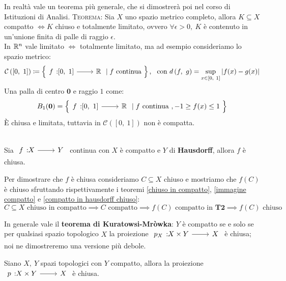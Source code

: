 \begin{digression}
In realtà vale un teorema più generale, che si dimostrerà poi nel corso di Istituzioni di Analisi.
\textsc{Teorema:} Sia $X$ uno spazio metrico completo, allora $K\subseteq X$ compatto $\iff K$ chiuso e totalmente limitato, ovvero $\forall\epsilon >0, \ K$ è contenuto in un'unione finita di palle di raggio $\epsilon$.\\
In $\mathbb{R}^n$ vale limitato $\iff$ totalmente limitato, ma ad esempio consideriamo lo spazio metrico:
	\begin{gather*}
		\mathcal{C}\left( [0, \ 1] \right) \coloneqq \left\{ \funz f {[0,\ 1]} \realset \mid f \text{ continua } \right\},  \ \ \text{con } \mvf{d}{f}{g} =\sup_{x\in [0, \ 1]} |f(x)-g(x)|
	\end{gather*}
Una palla di centro $\mathbf{0}$ e raggio $1$ come:
\begin{equation*}
	B_1(\mathbf{0})=\left\{ \funz f {[0,\ 1]} \realset \mid f \text{ continua }, -1\geq f(x) \leq 1 \ \right\}
\end{equation*}
È chiusa e limitata, tuttavia in $	\mathcal{C}\left( [0, \ 1] \right)$ non è compatta.
\end{digression}
\begin{theorema}~{}\\ \label{da compatto in T_2 è chiuso}
	Sia $\funz f X Y$ continua con $X$ è compatto e $Y$ di \textbf{Hausdorff}, allora $f$ è chiusa.
\end{theorema}
\begin{demonstration}
	Per dimostrare che $f$ è chiusa consideriamo $C\subseteq X$ chiuso e mostriamo che $f(C)$ è chiuso sfruttando rispettivamente i teoremi \ref{chiuso in compatto}, \ref{immagine compatto} e \ref{compatto in hausdorff chiuso}:
		\begin{equation*}
			C\subseteq X \text{ chiuso in compatto} \implies C \text{ compatto} \implies f(C) \text{ compatto in } \textbf{T2} \implies f(C) \text{ chiuso}
		\end{equation*}
\end{demonstration}
In generale vale il \textbf{teorema di Kuratowsi-Mròwka}: $Y$ è compatto se e solo se per qualsiasi spazio topologico $X$ la proiezione $\funz {p_X} {X\times Y} X$ è chiusa; noi ne dimostreremo una versione più debole.
\begin{theorema}
	Siano $X,\ Y$ spazi topologici con $Y$ compatto, allora la proiezione $\funz p {X\times Y} X$ è chiusa.
\end{theorema}
